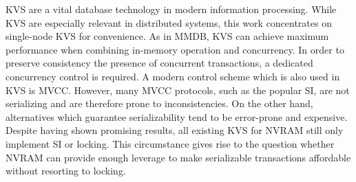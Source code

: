 KVS are a vital database technology in modern information processing. While KVS
are especially relevant in distributed systems, this work concentrates on
single-node KVS for convenience. As in MMDB, KVS can achieve maximum performance
when combining in-memory operation and concurrency. In order to preserve
consistency the presence of concurrent transactions, a dedicated concurrency
control is required. A modern control scheme which is also used in KVS is MVCC.
However, many MVCC protocols, such as the popular SI, are not serializing and
are therefore prone to inconsistencies. On the other hand, alternatives which
guarantee serializability tend to be error-prone and expensive. Despite having
shown promising results, all existing KVS for NVRAM still only implement SI or
locking. This circumstance gives rise to the question whether NVRAM can provide
enough leverage to make serializable transactions affordable without resorting
to locking.

